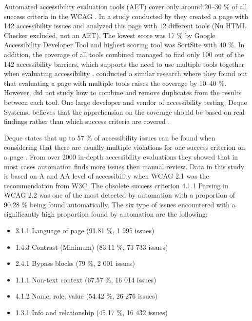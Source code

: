 Automated accessibility evaluation tools (AET) cover only around 20--30 \% of all success criteria in the WCAG \citep{govukaccessibilityresults, webaimmillions, dequecoverage}. In a study conducted by \textcite{govukaccessibilityresults} they created a page with 142 accessibility issues and analyzed this page with 12 different tools (Nu HTML Checker excluded, not an AET). The lowest score was 17 \% by Google Accessibility Developer Tool and highest scoring tool was SortSite with 40 \%. In addition, the coverage of all tools combined managed to find only 100 out of the 142 accessibility barriers, which supports the need to use multiple tools together when evaluating accessibility \citep{govukaccessibilityresults_blog}. \textcite{comparison_10.1145/3371300.3383346} conducted a similar research where they found out that evaluating a page with multiple tools raises the coverage by 10--40 \%. However, \textcite{comparison_10.1145/3371300.3383346} did not study how to combine and remove duplicates from the results between each tool. One large developer and vendor of accessibility testing, Deque Systems, believes that the apprehension on the coverage should be based on real findings rather than which success criteria are covered \citep{dequecoverage}. 

Deque states that up to 57 \% of accessibility issues can be found when considering that there are usually multiple violations for one success criterion on a page \citep{dequecoverage}. From over 2000 in-depth accessibility evaluations they showed that in most cases automation finds more issues then manual review. Data in this study is based on A and AA level of accessibility when WCAG 2.1 was the recommendation from W3C. The obsolete success criterion 4.1.1 Parsing in WCAG 2.2 was one of the most detected by automation with a proportion of 90.28 \% being found automatically. The six type of issues encountered with a significantly high proportion found by automation are the following: 

\begin{itemize}
  \item 3.1.1 Language of page (91.81 \%, 1 995 issues)
  \item 1.4.3 Contrast (Minimum) (83.11 \%, 73 733 issues)
  \item 2.4.1 Bypass blocks (79 \%, 2 001 issues)
  \item 1.1.1 Non-text context (67.57 \%, 16 014 issues)
  \item 4.1.2 Name, role, value (54.42 \%, 26 276 issues)
  \item 1.3.1 Info and relationship (45.17 \%, 16 432 issues)
\end{itemize}

